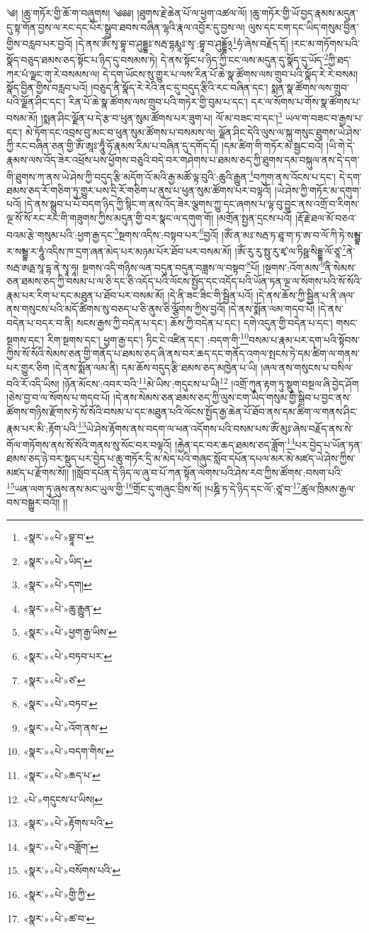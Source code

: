  ༄། །ཆུ་གཏོར་གྱི་ཆོ་ག་བཞུགས། ༄༅༅། །ཐུགས་རྗེ་ཆེན་པོ་ལ་ཕྱག་འཚལ་ལོ། །ཆུ་གཏོར་གྱི་ཡོ་བྱད་རྣམས་མདུན་དུ་སྟ་གོན་བྱས་ལ་རང་དང་པོར་སྒྲུབ་ཐབས་བཞིན་ལྷའི་རྣལ་འབྱོར་དུ་བྱས་ལ། ལུས་དང་ངག་དང་ཡིད་གསུམ་བྱིན་གྱིས་བརླབ་པར་བྱའོ། །དེ་ནས་ཨོཾ་སྭ་བྷཱ་བ་ཤུདྡྷཿ་སརྦ་དྷརྨཱཿ་སྭ་:བྷཱ་བ་ཤུདྡྷོ྅\footnote{«སྣར་»«པེ་»བྷཱ་བ་}ཧཾ་ཞེས་བརྗོད་དོ། །རང་མ་གཏོགས་པའི་སྣོད་བཅུད་ཐམས་ཅད་སྟོང་པ་ཉིད་དུ་བསམས་ཏེ། དེ་ནས་སྟོང་པ་ཉིད་ཀྱི་ངང་ལས་མདུན་དུ་སྣོད་དུ་ཡོད་\footnote{«སྣར་»«པེ་»ཡིད་}ཀྱི་ཐད་ཀར་པཾ་ལྗང་གུ་རེ་བསམས་ལ། དེ་དག་ཡོངས་སུ་གྱུར་པ་ལས་རིན་པོ་ཆེ་སྣ་ཚོགས་ལས་གྲུབ་པའི་སྣོད་རེ་རེ་བསམ། སྣོད་བྱིན་གྱིས་བརླབ་པའོ། །བཅུད་ནི་སྣོད་རེ་རེའི་ནང་དུ་བདུད་རྩིའི་རང་བཞིན་དང་། སྨན་སྣ་ཚོགས་ལས་གྲུབ་པའི་ལྗོན་ཤིང་དང་། རིན་པོ་ཆེ་སྣ་ཚོགས་ལས་གྲུབ་པའི་གཏེར་གྱི་བུམ་པ་དང་། དར་ལ་སོགས་པ་གོས་སྣ་ཚོགས་པ་བསམ་མོ། །སྨན་ཤིང་ལྗོན་པ་དེ་རྩ་བ་ཕུན་སུམ་ཚོགས་པར་ཟུག་པ། ལོ་མ་བཟང་བ་དང་།\footnote{«སྣར་»«པེ་»དག།} ཡལ་ག་བཟང་བ་རྒྱས་པ་དང་། མེ་ཏོག་དང་འབྲས་བུ་མང་བ་ཕུན་སུམ་ཚོགས་པ་བསམས་ལ། ལྗོན་ཤིང་དེའི་ལུས་ལ་སྐུ་གསུང་ཐུགས་ཡེ་ཤེས་ཀྱི་རང་བཞིན་ཅན་གྱི་ཨོཾ་ཨཱཿ་ཧཱུྃ་ཧོ་རྣམས་རིམ་པ་བཞིན་དུ་དགོད་དོ། །དམ་ཚིག་གི་གཏོར་མ་སྦྱང་བའོ། །ཡི་གེ་དེ་རྣམས་ལས་འོད་ཟེར་འཕྲོས་པས་ཕྱོགས་བཅུའི་བདེ་བར་གཤེགས་པ་ཐམས་ཅད་ཀྱི་ཐུགས་དམ་བསྐུལ་ནས་དེ་དག་གི་ཐུགས་ཀ་ནས་ཡེ་ཤེས་ཀྱི་བདུད་རྩི་མདོག་འོ་མའི་རྒྱ་མཚོ་ལྟ་བུའི་:ཆུའི་རྒྱུན་\footnote{«སྣར་»«པེ་»ཆུ་རྒྱུན་}བཀུག་ནས་འོངས་པ་དང་། དེ་དག་ཐམས་ཅད་རོ་གཅིག་ཏུ་གྱུར་པས་དྲི་རོ་གཅིག་པ་ནུས་པ་ཕུན་སུམ་ཚོགས་པར་བལྟའོ། །ཡེ་ཤེས་ཀྱི་གཏོར་མ་དགུག་པའོ། །དེ་ནས་སྒྲུབ་པ་པོ་བདག་ཉིད་ཀྱི་སྙིང་ག་ནས་འོད་ཟེར་ལྕགས་ཀྱུ་དང་ཞགས་པ་ལྟ་བུ་བྱུང་ནས་འགྲོ་བ་རིགས་ལྔ་སོ་སོ་རང་རང་གི་གཟུགས་ཀྱིས་མདུན་གྱི་བར་སྣང་ལ་དགུག་གོ། །མགྲོན་སྤྱན་དྲངས་པའོ། །རྡོ་རྗེ་ཐལ་མོ་བཅའ་བའམ་རྩེ་གསུམ་པའི་:ཕྱག་རྒྱ་དང་\footnote{«སྣར་»«པེ་»ཕྱག་རྒྱ་ཡིས་}སྔགས་འདིས་:བསྟབ་པར་\footnote{«སྣར་»«པེ་»བཏབ་པར་}བྱའོ། །ཨོཾ་ན་མཿ་སརྦ་ཏ་ཐཱ་ག་ཏ་ཨ་བ་ལོ་ཀི་ཏེ་སམྦྷ་ར་སམྦྷ་ར་ཧཱུཾ་འདིས་ཁ་དྲག་ཞན་མེད་པར་མཉམ་པོར་ཐོབ་པར་བསམ་མོ། །ཨོཾ་རུ་རུ་སྥུ་རུ་ཛྭ་ལ་ཏིཥྛ་སིདྡྷ་ལོ་ཙཱ་\footnote{«སྣར་»«པེ་»ཙ་}ནེ་སརྦ་ཨརྠ་སཱ་དྷ་ནེ་སྭཱ་ཧཱ། སྔགས་འདི་གཉིས་ལན་བདུན་བདུན་བཟླས་ལ་བསྟབ་\footnote{«སྣར་»«པེ་»བཏབ་}པོ། །སྔགས་:འོག་མས་\footnote{«སྣར་»«པེ་»འོག་ནས་}ནི་སེམས་ཅན་ཐམས་ཅད་ཀྱི་བསམ་པ་ལ་ཅི་དང་ཅི་འདོད་པའི་ལོངས་སྤྱོད་དང་འདོད་པའི་ཡོན་ཏན་ལྔ་ལ་སོགས་པའི་སོ་སོའི་རྣམ་པར་རིག་པ་དང་མཐུན་པ་ཐོབ་པར་བསམ་མོ། །དེ་ནི་ཟང་ཟིང་གི་སྦྱིན་པའོ། །དེ་ནས་ཆོས་ཀྱི་སྦྱིན་པ་ནི་ཞལ་ནས་གསུངས་པའི་མདོ་ཚིགས་སུ་བཅད་པ་ཅི་ནུས་ཅི་ལྕོགས་ཀྱིས་བྱའོ། །དེ་ནས་སྨོན་ལམ་གདབ་པོ། །དེ་ནས་བདེན་པ་བདར་བ་ནི། སངས་རྒྱས་ཀྱི་བདེན་པ་དང་། ཆོས་ཀྱི་བདེན་པ་དང་། དགེ་འདུན་གྱི་བདེན་པ་དང་། གསང་སྔགས་དང་། རིག་སྔགས་དང་། ཕྱག་རྒྱ་དང་། ཏིང་ངེ་འཛིན་དང་། :བདག་གི་\footnote{«སྣར་»«པེ་»བདག་གིས་}བསམ་པ་རྣམ་པར་དག་པའི་སྟོབས་ཀྱིས་སོ་སོའི་སེམས་ཅན་གྱི་གནོད་པ་ཐམས་ཅད་ཞི་ནས་བར་ཆད་དང་གནོད་འགལ་སྤངས་ཏེ་དམ་ཚིག་ལ་གནས་པར་གྱུར་ཅིག །དེ་ནས་སྨོན་ལམ་ནི། དམ་ཆོས་བདུད་རྩི་ཐམས་ཅད་མཁྱེན་པ་ཡི། །ཞལ་ནས་གསུངས་པ་བསིལ་བའི་རོ་འདི་ཡིས། །ཉོན་མོངས་:འབར་བའི་\footnote{«སྣར་»«པེ་»ཆད་པ་}མེ་ཡིས་:གདུངས་པ་ཡི།\footnote{«པེ་»གདུངས་པ་ཡིས།} །འགྲོ་ཀུན་རྟག་ཏུ་སྡུག་བསྔལ་ཞི་བྱེད་ཤོག །ཅེས་བྱ་བ་ལ་སོགས་པ་གདབ་པོ། །དེ་ནས་སེམས་ཅན་ཐམས་ཅད་ཀྱི་ལུས་ངག་ཡིད་གསུམ་གྱི་སྒྲིབ་པ་བྱང་ནས་ཚོགས་གཉིས་རྫོགས་ཏེ་སོ་སོའི་བསམ་པ་དང་མཐུན་པའི་ལོངས་སྤྱོད་རྒྱ་ཆེན་པོ་ཐོབ་ནས་དམ་ཚིག་ལ་གནས་ཤིང་རྣམ་པར་མི་:རྟོག་པའི་\footnote{«སྣར་»«པེ་»རྟོགས་པའི་}ཡེ་ཤེས་རྟོགས་ནས་བདག་ལ་ཕན་འདོགས་པའི་བསམ་པས་ཨོཾ་མུཿ་ཞེས་བརྗོད་ནས་སེ་གོལ་གཏོགས་ནས་སོ་སོའི་གནས་སུ་སོང་བར་བལྟའོ། །རྐྱེན་དང་བར་ཆད་ཐམས་ཅད་ཟློག་\footnote{«སྣར་»«པེ་»བཟློག་}པར་བྱེད་པ་ཡོན་ཏན་ཐམས་ཅད་ཉེ་བར་སྡུད་པར་བྱེད་པ་ཆུ་གཏོར་དྲི་མ་མེད་པའི་གཞུང་སློབ་དཔོན་དཔལ་མར་མེ་མཛད་ཡེ་ཤེས་ཀྱིས་མཛད་པ་རྫོགས་སོ།། །།སློབ་དཔོན་དེ་ཉིད་ལ་ཞུ་བ་པོ་ཀན་སྟོན་ལེགས་པའི་ཤེས་རབ་ཀྱིས་ཚོགས་:བསག་པའི་\footnote{«སྣར་»«པེ་»བསོགས་པའི་}ཡན་ལག་ཏུ་ཞུས་ནས་མང་ཡུལ་གྱི་\footnote{«སྣར་»«པེ་»གྱི་ཀྱི་}གྲོང་དུ་གཞུང་བྲིས་སོ། །པཎྜི་ཏ་དེ་ཉིད་དང་ལོ་:ཙཱ་བ་\footnote{«སྣར་»«པེ་»ཚ་བ་}ཚུལ་ཁྲིམས་རྒྱལ་བས་བསྒྱུར་བའོ།། །།